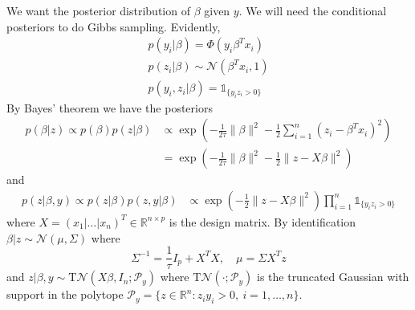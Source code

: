 \documentclass[11pt]{article}
\newcommand\RR{\mathbb{R}}
\newcommand{\calP}{\mathcal{P}}
\newcommand{\calN}{\mathcal{N}}
\begin{document}
We want the posterior distribution of $\beta$ given $y$. We will need the conditional posteriors to do Gibbs sampling.
Evidently,
\begin{align*}
	p(y_i|\beta)
	= \Phi(y_i\beta^Tx_i)  \\
	p(z_i | \beta)  \sim \calN(\beta^T x_i, 1)  \\
	p(y_i,z_i|\beta) = \mathds{1}_{\{y_iz_i > 0\}}
\end{align*}
By Bayes' theorem we have the posteriors
\begin{align*}
	p(\beta|z) \propto p(\beta)p(z|\beta)
	&\propto \exp\left(
		-\frac1{2\tau}\|\beta\|^2
		-\frac{1}{2}\sum_{i=1}^{n}(z_i - \beta^T x_i)^2
	\right)  \\
	&= \exp\left(
		-\frac1{2\tau}\|\beta\|^2
		-\frac{1}{2}\|z - X\beta\|^2
	\right)
\end{align*}
and
\begin{align*}
	p(z|\beta,y) \propto p(z|\beta)p(z,y|\beta)
	&\propto \exp\left(
	-\frac{1}{2}\|z - X\beta\|^2
	\right) \prod_{i=1}^{n} \mathds{1}_{\{y_iz_i > 0\}}
\end{align*}
where $X = (x_1|\ldots|x_n)^T \in \RR^{n \times p}$ is the design matrix. By identification $\beta|z \sim \calN(\mu, \Sigma)$ where
\[
	\Sigma^{-1} = \frac{1}{\tau}I_p + X^TX,
	\quad
	\mu = \Sigma X^Tz
\]
and $z|\beta,y \sim \mathrm{T}\calN(X\beta, I_n; \calP_y)$ where $\mathrm{T}\calN(\cdot; \calP_y)$ is the truncated Gaussian with support in the polytope $\calP_y = \{z\in\RR^n : z_i y_i > 0,\ i=1,\ldots,n\}$.
\end{document}
